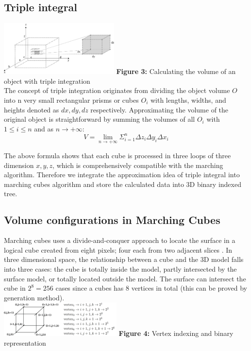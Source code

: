 \documentclass[11pt]{article}
\begin{document}
\begin{multicols}{2}
\subsection{Triple integral}
\includegraphics[width=0.45\textwidth]{Figures/Triple Integral.png}
\textbf{Figure 3:} Calculating the volume of an object with triple integration  \\

The concept of triple integration originates from dividing the object volume $O$ into n very small rectangular prisms or cubes $O_i$ with lengths, widths, and heights denoted as $dx,dy,dz$ respectively. Approximating the volume of the original object is straightforward by summing the volumes of all $O_i$ with $1 \leq i \leq n$ and as $n \rightarrow +\infty$:
$$
V = \lim_{n \rightarrow + \infty} \Sigma_{i=1}^{n} \Delta z_i \Delta y_i \Delta x_i
$$

The above formula shows that each cube is processed in three loops of three dimension $x,y,z$, which is comprehensively compatible with the marching algorithm. Therefore we integrate the approximation idea of triple integral into marching cubes algorithm and store the calculated data into 3D binary indexed tree.

\subsection{Volume configurations in Marching Cubes}

Marching cubes uses a divide-and-conquer approach to locate the surface in a logical cube created from eight pixels; four each from two adjacent slices \cite{loren}. In three dimensional space, the relationship between a cube and the 3D model falls into three cases: the cube is totally inside the model, partly intersected by the surface model, or totally located outside the model. The surface can intersect the cube in $2^8=256$ cases since a cubes has $8$ vertices in total (this can be proved by generation method). \\

\includegraphics[width=0.46\textwidth]{Figures/Binary Vertices.png}
\textbf{Figure 4:} Vertex indexing and binary representation  \\


\end{multicols}
\end{document}
